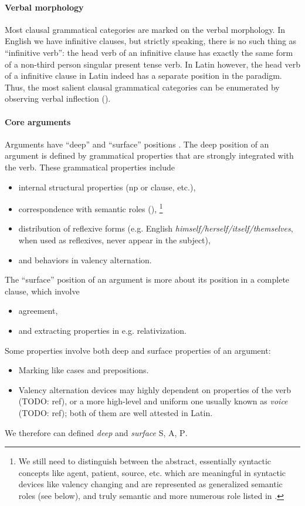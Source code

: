 \documentclass[a4paper, oneside, 12pt]{report}
\newcommand*{\citesec}[1]{\S~{#1}}
\newcommand{\form}[1]{\emph{#1}}
\newcommand*{\category}[1]{\textsc{#1}}
\begin{document}
\paragraph*{Verbal morphology} Most clausal grammatical categories are marked on the verbal morphology.
In English we have infinitive clauses,
but strictly speaking, there is no such thing as ``infinitive verb'':
the head verb of an infinitive clause 
has exactly the same form of a non-third person singular present tense verb.
In Latin however, the head verb of a infinitive clause in Latin 
indeed has a separate position in the paradigm.
Thus, the most salient clausal grammatical categories can be enumerated  
by observing verbal inflection ().

\paragraph*{Core arguments} 

Arguments have ``deep'' and ``surface'' positions \citep{dixon2009basic1}. 
The deep position of an argument is defined by 
grammatical properties that are strongly integrated with the verb.
These grammatical properties include 
\begin{itemize}
    \item internal structural properties (\acs{np} or clause, etc.),
    \item correspondence with semantic roles 
    (\citealt[\citesec{4.2}]{cgel}),%
    \footnote{
        We still need to distinguish between the abstract, 
        essentially syntactic concepts like agent, patient, source, etc.
        which are meaningful in syntactic devices like valency changing
        and are represented as generalized semantic roles (see below),
        and truly semantic and more numerous role listed in 
        \citet{dixon2005semantic}.
    }
    \item distribution of reflexive forms 
    (e.g. English \form{himself/herself/itself/themselves}, when used as reflexives, 
    never appear in the subject),
    \item and behaviors in valency alternation. 
\end{itemize}
The ``surface'' position of an argument is more about its position 
in a complete clause, which involve 
\begin{itemize}
    \item agreement,
    \item and extracting properties in e.g. relativization.
\end{itemize}
Some properties involve both deep and surface properties of an argument:
\begin{itemize}
    \item Marking like cases and prepositions.
    \item Valency alternation devices 
    may highly dependent on properties of the verb (TODO: ref),
    or a more high-level and uniform one  
    usually known as \emph{voice} (TODO: ref);
    both of them are well attested in Latin.
\end{itemize}
We therefore can defined \emph{deep} and \emph{surface} \category{S}, \category{A}, \category{P}.
\end{document}
